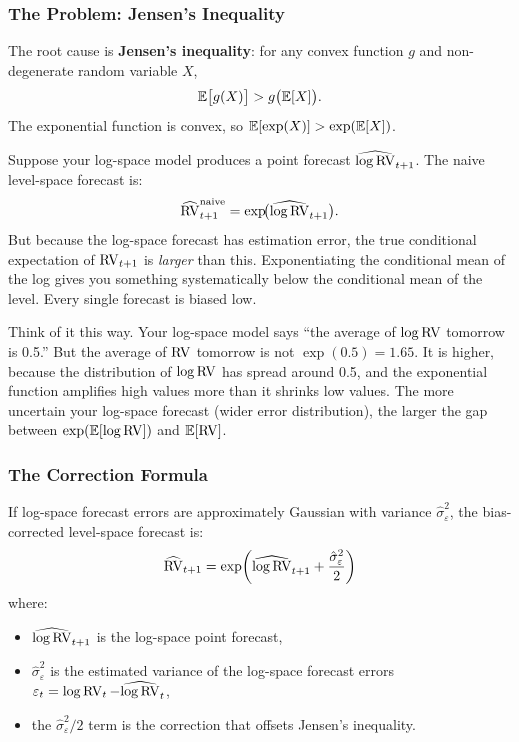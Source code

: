 \subsubsection{The Problem: Jensen's Inequality}

The root cause is \textbf{Jensen's inequality}: for any convex function $g$ and non-degenerate random variable $X$,
\begin{equation}
\label{eq:jensen}
\mathbb{E}\bigl[g(X)\bigr] > g\bigl(\mathbb{E}[X]\bigr).
\end{equation}
The exponential function is convex, so $\mathbb{E}[\exp(X)] > \exp(\mathbb{E}[X])$.

Suppose your log-space model produces a point forecast $\widehat{\log \operatorname{RV}}_{t+1}$.
The naive level-space forecast is:
\[
\widehat{\operatorname{RV}}^{\text{naive}}_{t+1} = \exp\!\bigl(\widehat{\log \operatorname{RV}}_{t+1}\bigr).
\]
But because the log-space forecast has estimation error, the true conditional expectation of $\operatorname{RV}_{t+1}$ is \emph{larger} than this.
Exponentiating the conditional mean of the log gives you something systematically below the conditional mean of the level.
Every single forecast is biased low.

\begin{intuition}
Think of it this way.
Your log-space model says ``the average of $\log \operatorname{RV}$ tomorrow is 0.5.''
But the average of $\operatorname{RV}$ tomorrow is not $\exp(0.5) = 1.65$.
It is higher, because the distribution of $\log \operatorname{RV}$ has spread around 0.5, and the exponential function amplifies high values more than it shrinks low values.
The more uncertain your log-space forecast (wider error distribution), the larger the gap between $\exp(\mathbb{E}[\log \operatorname{RV}])$ and $\mathbb{E}[\operatorname{RV}]$.
\end{intuition}

\subsubsection{The Correction Formula}

If log-space forecast errors are approximately Gaussian with variance $\hat{\sigma}^2_\varepsilon$, the bias-corrected level-space forecast is:
\begin{equation}
\label{eq:retransform}
\widehat{\operatorname{RV}}_{t+1} = \exp\!\left(\widehat{\log \operatorname{RV}}_{t+1} + \frac{\hat{\sigma}^2_\varepsilon}{2}\right)
\end{equation}
where:
\begin{itemize}[nosep]
  \item $\widehat{\log \operatorname{RV}}_{t+1}$ is the log-space point forecast,
  \item $\hat{\sigma}^2_\varepsilon$ is the estimated variance of the log-space forecast errors $\varepsilon_t = \log \operatorname{RV}_t - \widehat{\log \operatorname{RV}}_t$,
  \item the $\hat{\sigma}^2_\varepsilon / 2$ term is the correction that offsets Jensen's inequality.
\end{itemize}

